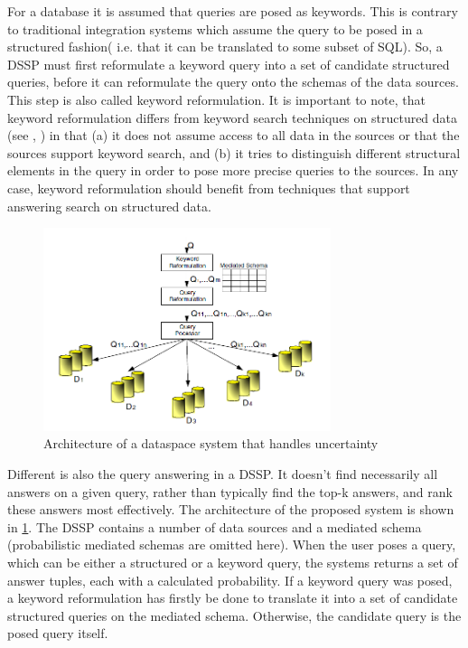 For a database it is assumed that queries are posed as keywords. This is contrary to traditional integration systems which assume the query to be posed in a structured fashion( i.e. that it can be translated to some subset of SQL). So, a DSSP must first reformulate a keyword query into a set of candidate structured queries, before it can reformulate the query onto the schemas of the data sources. This step is also called keyword reformulation.  It is important to note, that keyword reformulation differs from keyword search techniques on structured data (see \cite{994693}, \cite{Hristidis:2002:DKS:1287369.1287427}) in that (a) it does not assume access to all data in the sources or that the sources support keyword search, and (b) it tries to distinguish different structural elements in the query in order to pose more precise queries to the sources. In any case, keyword reformulation should benefit from techniques that support answering search on structured data.

\begin{figure}[H]
	\begin{center}
		\includegraphics[width=0.75\textwidth]{figures/DataModelingInDSSPs-Figure1.png}
	\end{center}
	\caption{Architecture of a dataspace system that handles uncertainty \cite[p. 124]{DBLP:conf/birthday/SarmaDH09}}
	\label{DataModelingInDSSPsFigure1}
\end{figure}

Different is also the query answering in a DSSP. It doesn't find necessarily all answers on a given query, rather than typically find the top-k answers, and rank these answers most effectively. 
The architecture of the proposed system is shown in \ref{DataModelingInDSSPsFigure1}. The DSSP contains a number of data sources and a mediated schema (probabilistic mediated schemas are omitted here). When the user poses a query, which can be either a structured or a keyword query, the systems returns a set of answer tuples, each with a calculated probability. If a keyword query was posed, a keyword reformulation has firstly be done to translate it into a set of candidate structured queries on the mediated schema. Otherwise, the candidate query is the posed query itself.